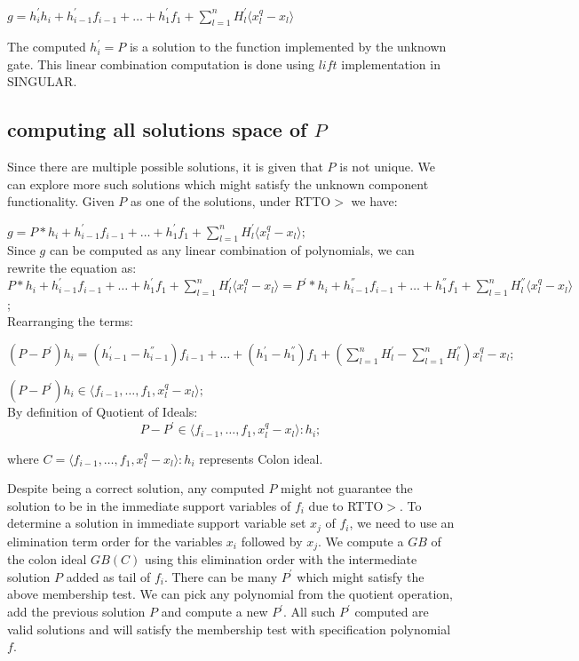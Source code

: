  $g = h_i^{'}h_i+h_{i-1}^{'}f_{i-1}+\dots+h_1^{'}f_1+\sum\limits_{l=1}^{n}H_l^{'}\langle x_l^q-x_l\rangle$

The computed $h_i^{'} = P$ is a solution to the function implemented by the unknown gate. This linear combination computation is done using $lift$
 implementation in SINGULAR\cite{DGPS_410}.

\subsection{computing all solutions space of $P$}

Since there are multiple possible solutions, it is given that $P$ is not unique. We can explore more such solutions which might satisfy the unknown component functionality. Given $P$ as one of the solutions, under RTTO$>$ we have:

$g = P*h_i+h_{i-1}^{'}f_{i-1}+\dots+h_1^{'}f_1+\sum\limits_{l=1}^{n}H_l^{'}\langle x_l^q-x_l\rangle;$\\
Since $g$ can be computed as any linear combination of polynomials, we can rewrite the equation as:\\
$P*h_i+h_{i-1}^{'}f_{i-1}+\dots+h_1^{'}f_1+\sum\limits_{l=1}^{n}H_l^{'}\langle x_l^q-x_l\rangle = P^{'}*h_i+h_{i-1}^{''}f_{i-1}+\dots+h_1^{''}f_1+\sum\limits_{l=1}^{n}H_l^{''}\langle x_l^q-x_l\rangle$;\\
Rearranging the terms:

$(P-P^{'})h_i = (h_{i-1}^{'}-h_{i-1}^{''})f_{i-1}+\dots+(h_{1}^{'}-h_{1}^{''})f_{1}+(\sum\limits_{l=1}^{n}H_l^{'}-\sum\limits_{l=1}^{n}H_l^{''})x_l^q-x_l;$

$(P-P^{'})h_i \in \langle f_{i-1},\dots,f_1,x_l^q-x_l\rangle;$\\
By definition of Quotient of Ideals:
\vspace{0.1in}
\begin{equation}
\label{quotcomp}
P-P^{'} \in \langle f_{i-1},\dots,f_1,x_l^q-x_l\rangle:h_i;
\end{equation}

where $C = \langle f_{i-1},\dots,f_1,x_l^q-x_l\rangle:h_i$ represents Colon ideal.

Despite being a correct solution, any computed $P$ might not guarantee the solution to be in the immediate support variables of $f_i$ due to RTTO$>$. To determine a solution in immediate support variable set $x_j$ of $f_i$, we need to use an elimination term order
for the variables $x_i$ followed by $x_j$. We compute a $GB$ of the colon ideal $GB(C)$ using this elimination order with the intermediate solution $P$ added as tail of $f_i$. 
There can be many $P^{'}$ which might satisfy the above membership test. We can pick any polynomial from the quotient operation, add the previous solution $P$ and compute a new $P^{'}$. All such $P^{'}$ computed are valid solutions and will satisfy the membership test with specification polynomial $f$.

